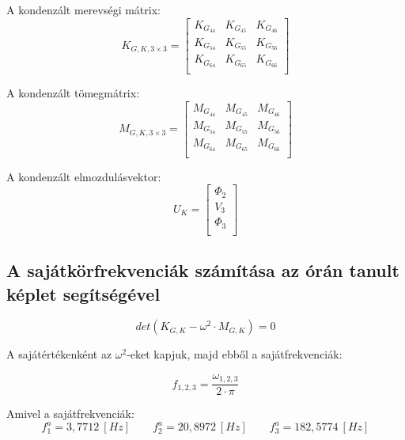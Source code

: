 \documentclass{article}
\begin{document}
		A kondenzált merevségi mátrix: 
		\begin{equation}
			K_{G,K,3\times3}=
			\begin{bmatrix}
			 K_{G_{44}}	 & K_{G_{45}}	 & K_{G_{46}}   \\
			 K_{G_{54}}	 & K_{G_{55}}	 & K_{G_{56}}   \\
			 K_{G_{64}}	 & K_{G_{65}}	 & K_{G_{66}}   \\
			\end{bmatrix}
		\end{equation}
		
		A kondenzált tömegmátrix: 
		\begin{equation}
			M_{G,K,3\times3}=
			\begin{bmatrix}
			 M_{G_{44}}	 & M_{G_{45}}	 & M_{G_{46}}   \\
			 M_{G_{54}}	 & M_{G_{55}}	 & M_{G_{56}}   \\
			 M_{G_{64}}	 & M_{G_{65}}	 & M_{G_{66}}   \\
			\end{bmatrix}
		\end{equation}
		
		A kondenzált elmozdulásvektor:
		\begin{equation}
			U_K=
			\begin{bmatrix}
				\Phi_{2} \\
				V_{3}    \\
				\Phi_{3} \\
			\end{bmatrix}
		\end{equation} 
	
	\subsection{A sajátkörfrekvenciák számítása az órán tanult képlet segítségével}
	
		\begin{equation}
			det(K_{G,K} - \omega^2 \cdot M_{G,K}) = 0
		\end{equation}
		
		A sajátértékenként az $\omega^2$-eket kapjuk, majd ebből a sajátfrekvenciák:
		
		\begin{equation}
			f_{1,2,3}=\frac{\omega_{1,2,3}}{2\cdot \pi}
		\end{equation}
		
		Amivel a sajátfrekvenciák:	
		\[f_1^a=3,7712~[Hz] \qquad f_2^a=20,8972~[Hz] \qquad f_3^a=182,5774~[Hz]  \]
		
\end{document}
